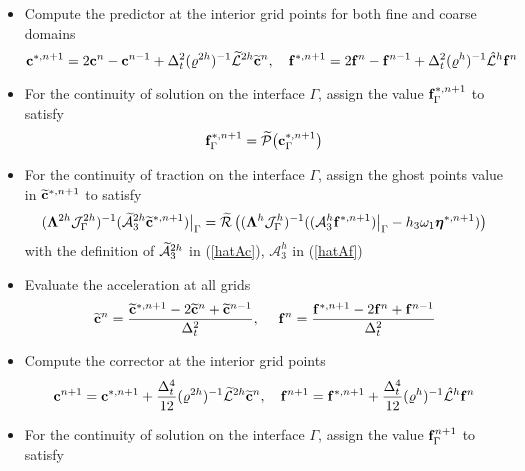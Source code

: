 \begin{breakablealgorithm}
	\begin{itemize}
		\item  {Compute the predictor at the interior grid points for both fine and coarse domains
			\begin{equation*}
			{\bf c}^{*,n+1} = 2{\bf c}^{n} - {\bf c}^{n-1} + \Delta_t^2(\varrho^{2h})^{-1}{\wt{\mathcal{L}}}^{2h} \wt{\bf{c}}^{n},\ \ \ 
			{\bf f}^{*,n+1} = 2{\bf f}^{n} - {\bf f}^{n-1} + \Delta_t^2(\varrho^h)^{-1}\hat{\mathcal{L}}^{h} {\bf{f}}^{n}
			\end{equation*}
		}
		\item{For the continuity of solution on the interface $\Gamma$, assign the value ${\bf f}_{\Gamma}^{*,n+1}$ to satisfy
			\begin{equation*}
			{\bf f}^{*,n+1}_{\Gamma} = \widetilde{\mathcal{P}}\big({\bf c}^{*,n+1}_{\Gamma}\big)
			\end{equation*}
		}
		\item{For the continuity of traction on the interface $\Gamma$, assign the ghost points value in $\widetilde{\bf c}^{*,n+1}$ to satisfy
			\begin{equation}\label{traction_gamma_pre}
			(\bm{\Lambda}^{2h}{\mathcal J}_{\Gamma}^{2h})^{-1}(\wt{\mathcal{A}}_3^{2h}\wt{\bf c}^{*,n+1})\big|_\Gamma
			= \wt{\mathcal{R}}\left((\bm{\Lambda}^{h}{\mathcal J}^h_{\Gamma})^{-1}((\mathcal{A}_3^h{\bf f}^{*,n+1})\big|_\Gamma-h_3\omega_1{\bm \eta}^{\ast,n+1})\right)
			\end{equation}
			with the definition of $\widetilde{\mathcal{A}}_3^{2h}$ in (\ref{hatAc}), $\mathcal{A}_3^h$ in (\ref{hatAf}) 
		}
		\item{Evaluate the acceleration at all grids 
			\begin{equation*}
			\widetilde{\bf c}^n= \frac{\widetilde{\bf c}^{*,n+1}-2\widetilde{\bf c}^{n}+\widetilde{\bf c}^{n-1}}{\Delta^2_t},\ \ \ \
			{\bf f}^{n} = \frac{{\bf f}^{*,n+1}-2{\bf f}^{n}+{\bf f}^{n-1}}{\Delta^2_t}
			\end{equation*}
		}
		\item{Compute the corrector at the interior grid points
			\begin{equation*}
			{\bf c}^{n+1} = {\bf c}^{*,n+1} + \frac{\Delta_t^4}{12}(\varrho^{2h})^{-1}\wt{\mathcal{L}}^{2h}\wt{\bf{c}}^{n},\ \ \ 
			{\bf f}^{n+1} = {\bf f}^{*,n+1} + \frac{\Delta_t^4}{12}(\varrho^{h})^{-1}\hat{\mathcal{L}}^{h}{\bf{f}}^{n}
			\end{equation*}
		}
		\item{For the continuity of solution on the interface $\Gamma$, assign the value ${\bf f}^{n+1}_\Gamma$ to satisfy
}
\end{itemize}
\end{breakablealgorithm}
